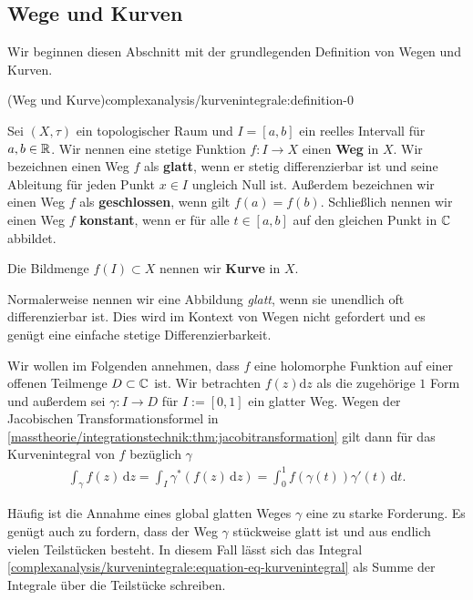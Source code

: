 \subsection{Wege und Kurven}
\label{\detokenize{complexanalysis/kurvenintegrale:wege-und-kurven}}
\par
Wir beginnen diesen Abschnitt mit der grundlegenden Definition von Wegen und Kurven.
\begin{definition}{(Weg und Kurve)}{complexanalysis/kurvenintegrale:definition-0}



\par
Sei \((X,\tau)\) ein topologischer Raum und \(I = [a,b]\) ein reelles Intervall für \(a,b \in \mathbb{R}\).
Wir nennen eine stetige Funktion \(f \colon I \rightarrow X\) einen \textbf{Weg} in \(X\).
Wir bezeichnen einen Weg \(f\) als \textbf{glatt}, wenn er stetig differenzierbar ist und seine Ableitung für jeden Punkt \(x \in I\) ungleich Null ist.
Außerdem bezeichnen wir einen Weg \(f\) als \textbf{geschlossen}, wenn gilt \(f(a) = f(b)\).
Schließlich nennen wir einen Weg \(f\) \textbf{konstant}, wenn er für alle \(t \in [a,b]\) auf den gleichen Punkt in \(\mathbb{C}\) abbildet.

\par
Die Bildmenge \(f(I) \subset X\) nennen wir \textbf{Kurve} in \(X\).
\end{definition}

\begin{emphBox}{}{}
\par
Normalerweise nennen wir eine Abbildung \emph{glatt}, wenn sie unendlich oft differenzierbar ist.
Dies wird im Kontext von Wegen nicht gefordert und es genügt eine einfache stetige Differenzierbarkeit.
\end{emphBox}

\par
Wir wollen im Folgenden annehmen, dass \(f\) eine holomorphe Funktion auf einer offenen Teilmenge \(D \subset \mathbb{C}\) ist.
Wir betrachten \(f(z) \mathrm{d}z\) als die zugehörige \(1\) Form und außerdem sei \(\gamma \colon I \rightarrow D\) für \(I := [0,1]\) ein glatter Weg.
Wegen der Jacobischen Transformationsformel in \cref{masstheorie/integrationstechnik:thm:jacobitransformation} gilt dann für das Kurvenintegral von \(f\) bezüglich \(\gamma\)
\begin{align}\label{equation:complexanalysis/kurvenintegrale:eq:kurvenintegral}
\int_{\gamma} f(z) \, \mathrm{d}z = \int_I \gamma^*(f(z) \, \mathrm{d}z) = \int_0^1 f(\gamma(t)) \gamma'(t) \, \mathrm{d}t.
\end{align}
\par
Häufig ist die Annahme eines global glatten Weges \(\gamma\) eine zu starke Forderung.
Es genügt auch zu fordern, dass der Weg \(\gamma\) stückweise glatt ist und aus endlich vielen Teilstücken besteht.
In diesem Fall lässt sich das Integral \cref{complexanalysis/kurvenintegrale:equation-eq-kurvenintegral} als Summe der Integrale über die Teilstücke schreiben.

